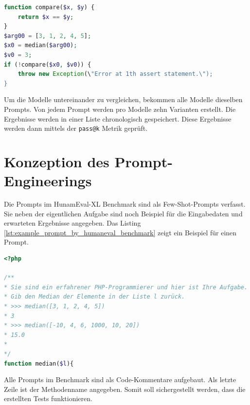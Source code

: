 \begin{lstlisting}[language=php,caption={Beispiel für einen Test aus dem HumanEval-XL Benchmark},label=lst:example_prompt_test_by_humaneval_benchmark]
function compare($x, $y) {
	return $x == $y;
}
$arg00 = [3, 1, 2, 4, 5];
$x0 = median($arg00);
$v0 = 3;
if (!compare($x0, $v0)) {
	throw new Exception(\"Error at 1th assert statement.\");
}
\end{lstlisting}


Um die Modelle untereinander zu vergleichen, bekommen alle Modelle dieselben Prompts. Von jedem Prompt werden pro Modelle zehn Varianten erstellt. Die Ergebnisse werden in einer Liste chronologisch gespeichert. Diese Ergebnisse werden dann mittels der \texttt{pass@k} Metrik geprüft.



\section{Konzeption des Prompt-Engineerings}
Die Prompts im HunamEval-XL Benchmark sind als Few-Shot-Prompts verfasst. Sie neben der eigentlichen Aufgabe sind noch Beispiel für die Eingabedaten und erwarteten Ergebnisse angegeben. Das Listing \ref{lst:example_prompt_by_humaneval_benchmark} zeigt ein Beispiel für einen Prompt.

\begin{lstlisting}[language=php,caption={Prompt Beispiel für  eine Aufgabe aus dem HumanEval-XL Benchmark},label=lst:example_prompt_by_humaneval_benchmark]
<?php

/**
* Sie sind ein erfahrener PHP-Programmierer und hier ist Ihre Aufgabe.
* Gib den Median der Elemente in der Liste l zurück.
* >>> median([3, 1, 2, 4, 5])
* 3
* >>> median([-10, 4, 6, 1000, 10, 20])
* 15.0
*
*/
function median($l){
\end{lstlisting}

Alle Prompts im Benchmark sind als Code-Kommentare aufgebaut. Als letzte Zeile ist der Methodenname angegeben. Somit soll sichergestellt werden, dass die erstellten Tests funktionieren.\vspace{0.2cm}


